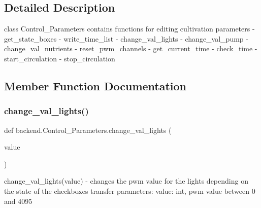 \subsection{Detailed Description}
\begin{DoxyVerb}class Control_Parameters contains functions for editing cultivation parameters
    - get_state_boxes
    - write_time_list
    - change_val_lights
    - change_val_pump
    - change_val_nutrients
    - reset_pwm_channels
    - get_current_time
    - check_time
    - start_circulation
    - stop_circulation
\end{DoxyVerb}
 

\subsection{Member Function Documentation}
\mbox{\label{classbackend_1_1Control__Parameters_ae5c14a3e6d3cb8ab572afa7d732abe93_ae5c14a3e6d3cb8ab572afa7d732abe93}} 
\subsubsection{\texorpdfstring{change\+\_\+val\+\_\+lights()}{change\_val\_lights()}}
{\footnotesize\ttfamily def backend.\+Control\+\_\+\+Parameters.\+change\+\_\+val\+\_\+lights (\begin{DoxyParamCaption}\item[{}]{value }\end{DoxyParamCaption})}

\begin{DoxyVerb}change_val_lights(value)
    - changes the pwm value for the lights depending on the state of the checkboxes
transfer parameters:
    value: int, pwm value between 0 and 4095
\end{DoxyVerb}
 \mbox{\label{classbackend_1_1Control__Parameters_afd7d566a865d6ce63c6b14982409eda8_afd7d566a865d6ce63c6b14982409eda8}} 
